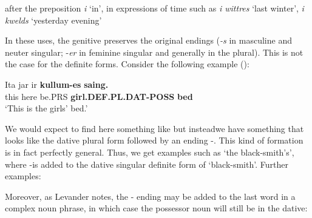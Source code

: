 {{%
after the preposition \textit{i} ‘in’, in expressions of time such as \textit{i wittres} ‘last winter’, \textit{i kwelds }‘yesterday evening’



In these uses, the genitive preserves the original endings (\textit{\nobreakdash-s }in masculine and neuter singular; \nobreakdash-\textit{er} in feminine singular and generally in the plural). This is not the case for the definite forms. Consider the following example (\citet[96]{Levander1909}):


\ea\label{}
\gll Ita  jar  ir  \textbf{kullum-es}\textbf{  saing.}\\
this  here  be.PRS  \textbf{girl.DEF.PL.DAT-POSS} \textbf{bed}\\
\glt ‘This is the girls’ bed.’
\z

We would expect to find here something like but instead\textstyleLinguisticExample{ }we have something that looks like the dative plural form  followed by an ending \nobreakdash-. This kind of formation is in fact perfectly general. Thus, we get examples such as  ‘the black-smith’s’, where \nobreakdash-is added to the dative singular definite form  of  ‘black-smith’. Further examples:


\ea\label{}

\z
\z 
Moreover, as Levander notes, the \nobreakdash- ending may be added to the last word in a complex noun phrase, in which case the possessor noun will still be in the dative:

}}
